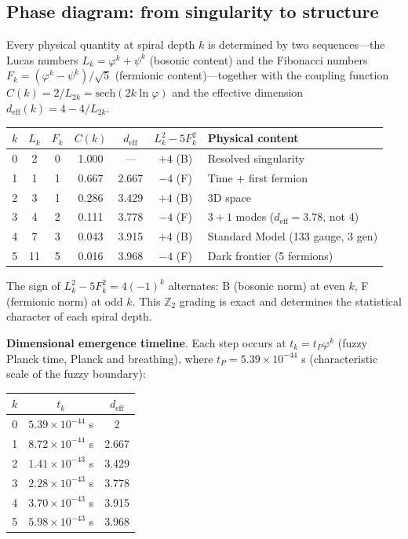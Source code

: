 \documentclass[12pt,a4paper]{article}
\begin{document}
\subsection{Phase diagram: from singularity to structure}

Every physical quantity at spiral depth $k$ is determined by two sequences---the Lucas numbers $L_k = \varphi^k + \psi^k$ (bosonic content) and the Fibonacci numbers $F_k = (\varphi^k - \psi^k)/\sqrt{5}$ (fermionic content)---together with the coupling function $C(k) = 2/L_{2k} = \mathrm{sech}(2k\ln\varphi)$ and the effective dimension $d_{\mathrm{eff}}(k) = 4 - 4/L_{2k}$.

\begin{center}
\begin{tabular}{|c|c|c|c|c|c|l|}
\hline
$k$ & $L_k$ & $F_k$ & $C(k)$ & $d_{\mathrm{eff}}$ & $L_k^2{-}5F_k^2$ & Physical content \\
\hline
0 & 2 & 0 & 1.000 & --- & $+4$ (B) & Resolved singularity \\
1 & 1 & 1 & 0.667 & 2.667 & $-4$ (F) & Time $+$ first fermion \\
2 & 3 & 1 & 0.286 & 3.429 & $+4$ (B) & 3D space \\
3 & 4 & 2 & 0.111 & 3.778 & $-4$ (F) & $3{+}1$ modes ($d_{\mathrm{eff}} = 3.78$, not 4) \\
4 & 7 & 3 & 0.043 & 3.915 & $+4$ (B) & Standard Model (133 gauge, 3 gen) \\
5 & 11 & 5 & 0.016 & 3.968 & $-4$ (F) & Dark frontier (5 fermions) \\
\hline
\end{tabular}
\end{center}

\noindent The sign of $L_k^2 - 5F_k^2 = 4(-1)^k$ alternates: B (bosonic norm) at even $k$, F (fermionic norm) at odd $k$. This $\mathbb{Z}_2$ grading is exact and determines the statistical character of each spiral depth.

\textbf{Dimensional emergence timeline}. Each step occurs at $t_k = t_P \varphi^k$ (fuzzy Planck time, Planck and breathing), where $t_P = 5.39 \times 10^{-44}$ s (characteristic scale of the fuzzy boundary):
\begin{center}
\begin{tabular}{|c|c|c|}
\hline
$k$ & $t_k$ & $d_{\mathrm{eff}}$ \\
\hline
0 & $5.39 \times 10^{-44}$ s & 2 \\
1 & $8.72 \times 10^{-44}$ s & 2.667 \\
2 & $1.41 \times 10^{-43}$ s & 3.429 \\
3 & $2.28 \times 10^{-43}$ s & 3.778 \\
4 & $3.70 \times 10^{-43}$ s & 3.915 \\
5 & $5.98 \times 10^{-43}$ s & 3.968 \\
\hline
\end{tabular}
\end{center}
\end{document}
